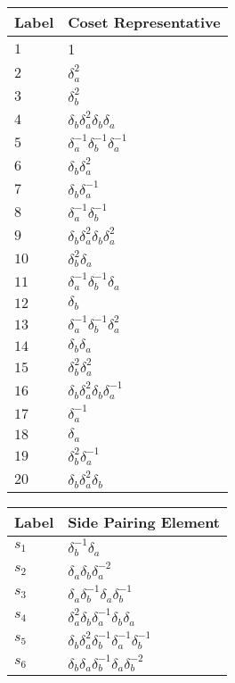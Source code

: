 \documentclass{article}
\begin{document}
\begin{center}
\begin{tabular}{ll}
\toprule
Label & Coset Representative\\
\midrule
$1$ & 1 \\
$2$ & $\delta_a^{2}$ \\
$3$ & $\delta_b^{2}$ \\
$4$ & $\delta_b^{}\delta_a^{2}\delta_b^{}\delta_a^{}$ \\
$5$ & $\delta_a^{-1}\delta_b^{-1}\delta_a^{-1}$ \\
$6$ & $\delta_b^{}\delta_a^{2}$ \\
$7$ & $\delta_b^{}\delta_a^{-1}$ \\
$8$ & $\delta_a^{-1}\delta_b^{-1}$ \\
$9$ & $\delta_b^{}\delta_a^{2}\delta_b^{}\delta_a^{2}$ \\
$10$ & $\delta_b^{2}\delta_a^{}$ \\
$11$ & $\delta_a^{-1}\delta_b^{-1}\delta_a^{}$ \\
$12$ & $\delta_b^{}$ \\
$13$ & $\delta_a^{-1}\delta_b^{-1}\delta_a^{2}$ \\
$14$ & $\delta_b^{}\delta_a^{}$ \\
$15$ & $\delta_b^{2}\delta_a^{2}$ \\
$16$ & $\delta_b^{}\delta_a^{2}\delta_b^{}\delta_a^{-1}$ \\
$17$ & $\delta_a^{-1}$ \\
$18$ & $\delta_a^{}$ \\
$19$ & $\delta_b^{2}\delta_a^{-1}$ \\
$20$ & $\delta_b^{}\delta_a^{2}\delta_b^{}$ \\
\bottomrule
\end{tabular}
\hfill
\begin{tabular}{ll}
\toprule
Label & Side Pairing Element\\
\midrule
$s_{1}$ & $\delta_b^{-1}\delta_a^{}$ \\
$s_{2}$ & $\delta_a^{}\delta_b^{}\delta_a^{-2}$ \\
$s_{3}$ & $\delta_a^{}\delta_b^{-1}\delta_a^{}\delta_b^{-1}$ \\
$s_{4}$ & $\delta_a^{2}\delta_b^{}\delta_a^{-1}\delta_b^{}\delta_a^{}$ \\
$s_{5}$ & $\delta_b^{}\delta_a^{2}\delta_b^{-1}\delta_a^{-1}\delta_b^{-1}$ \\
$s_{6}$ & $\delta_b^{}\delta_a^{}\delta_b^{-1}\delta_a^{}\delta_b^{-2}$ \\

\end{tabular}
\end{center}
\end{document}

